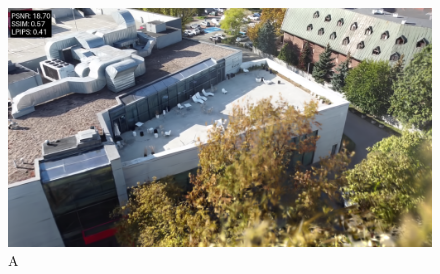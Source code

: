\begin{figure}[!h]
    \includegraphics[width=\linewidth]{img/res_imgs/eval_with_metrics_0010_14.png}
    \caption{A}\label{fig:eval_14}
\end{figure}
